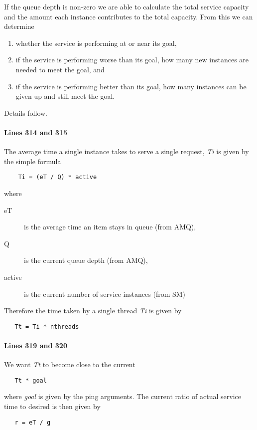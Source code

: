     If the queue depth is non-zero we are able to calculate the total
    service capacity and the amount each instance contributes to the
    total capacity.  From this we can determine 
    \begin{enumerate}
      \item whether the service is performing at or near its goal, 
      \item if the service is performing worse than its goal, how many
        new instances are needed to meet the goal, and
      \item if the service is performing better than its goal, how many
        instances can be given up and still meet the goal.
   \end{enumerate}

   Details follow.

   \paragraph{Lines 314 and 315}
   The average time a single instance takes to serve a single request, {\em Ti}  is given
   by the simple formula 

\begin{verbatim}
    Ti = (eT / Q) * active
\end{verbatim}
 where

   \begin{description}
     \item[eT] is the average time an item stays in queue (from AMQ),
     \item[Q] is the current queue depth (from AMQ),
     \item[active] is the current number of service instances (from SM)
   \end{description}

   Therefore the time taken by a single thread {\em Ti} is given by 
\begin{verbatim}
   Tt = Ti * nthreads
\end{verbatim}

   \paragraph{Lines 319 and 320}
   We want {\em Tt} to become close to the current
\begin{verbatim}
   Tt * goal 
\end{verbatim}

    where {\em goal} is given by the ping arguments.  The 
   current ratio of actual service time to desired is then given by
\begin{verbatim}
   r = eT / g
\end{verbatim}

